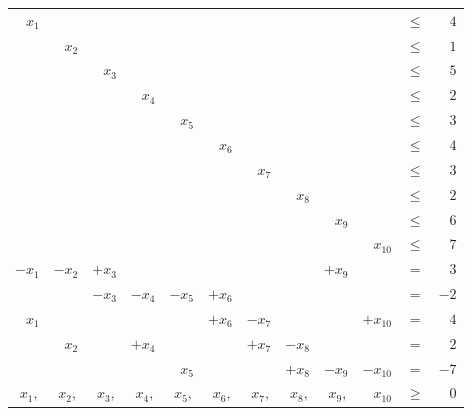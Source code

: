\documentclass[11pt,a4paper,english]{article}
\begin{document}
\begin{table}[H]
   \begin{tabular}{rrrrrrrrrrrr}
   $x_1$  & ~      & ~      & ~      & ~      & ~      & ~      & ~      & ~      & ~         & $\leq$ & $ 4$ \\
   ~      & $x_2$  & ~      & ~      & ~      & ~      & ~      & ~      & ~      & ~         & $\leq $ & $1$ \\
   ~      & ~      & $x_3$  & ~      & ~      & ~      & ~      & ~      & ~      & ~         & $\leq$ & $ 5$ \\
   ~      & ~      & ~      & $x_4$  & ~      & ~      & ~      & ~      & ~      & ~         & $\leq$ & $ 2$ \\
   ~      & ~      & ~      & ~      & $x_5$  & ~      & ~      & ~      & ~      & ~         & $\leq$ & $ 3$ \\
   ~      & ~      & ~      & ~      & ~      & $x_6$  & ~      & ~      & ~      & ~         & $\leq$ & $4$  \\
   ~      & ~      & ~      & ~      & ~      & ~      & $x_7$  & ~      & ~      & ~         & $\leq$ & $ 3$ \\
   ~      & ~      & ~      & ~      & ~      & ~      & ~      & $x_8$  & ~      & ~         & $\leq $ & $2$ \\
   ~      & ~      & ~      & ~      & ~      & ~      & ~      & ~      & $x_9$  & ~         & $\leq $ & $6$ \\
   ~      & ~      & ~      & ~      & ~      & ~      & ~      & ~      & ~      & $x_{10}$  & $\leq $ & $7$ \\
   $-x_1$ & $-x_2$ & $+x_3$ & ~      & ~      & ~      & ~      & ~      & $+x_9$ & ~         & $=$ & $ 3$    \\
   ~      & ~      & $-x_3$ & $-x_4$ & $-x_5$ & $+x_6$ & ~      & ~      & ~      & ~         & $=$ & $-2$    \\
   $x_1$  & ~      & ~      & ~      & ~      & $+x_6$ & $-x_7$ & ~      & ~      & $+x_{10}$ & $=$ & $4$     \\
   ~      & $x_2$  & ~      & $+x_4$ & ~      & ~      & $+x_7$ & $-x_8$ & ~      & ~         & $=$ & $2$     \\
   ~      & ~      & ~      & ~      & $x_5$  & ~      & ~      & $+x_8$ & $-x_9$ & $-x_{10}$ & $=$ & $-7$    \\
   $x_1,$ & $x_2,$ & $x_3,$ & $x_4,$ & $x_5,$ & $x_6,$ & $x_7,$ & $x_8,$ & $x_9,$ & $x_{10}$  & $\geq$ & $ 0$ \\
   \end{tabular}
\end{table}
\end{document}
